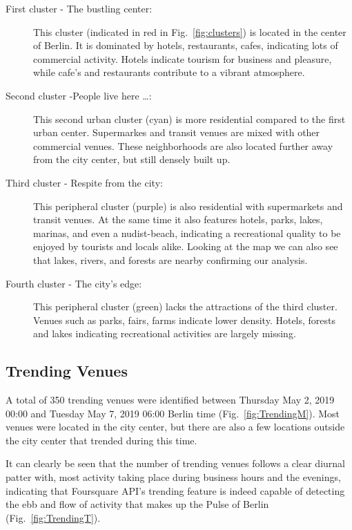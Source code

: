 \documentclass[letter]{scrartcl}
\begin{document}
\begin{description}
	\item[First cluster - The bustling center:] This cluster (indicated in red in Fig.~\ref{fig:clusters}) is located in the center of Berlin. It is dominated by hotels, restaurants, cafes, indicating lots of commercial activity. Hotels indicate tourism for business and pleasure, while cafe's and restaurants contribute to a vibrant atmosphere.  
	\item[Second cluster -People live here \ldots:] This second urban cluster (cyan) is more residential compared to the first urban center. Supermarkes and transit venues are mixed with other commercial venues. These neighborhoods are also located further away from the city center, but still densely built up.
	\item[Third cluster - Respite from the city:] This peripheral cluster (purple) is also  residential with supermarkets and transit venues. At the same time it also features hotels, parks, lakes, marinas, and even a nudist-beach, indicating a recreational quality to be enjoyed by tourists and locals alike. Looking at the map we can also see that lakes, rivers, and forests are nearby confirming our analysis.	
	\item[Fourth cluster -  The city's edge:] This peripheral cluster (green) lacks the attractions of the third cluster. Venues such as parks, fairs, farms indicate lower density. Hotels, forests and lakes indicating recreational activities are largely missing.  
\end{description}

\subsection{Trending Venues}

A total of 350 trending venues were identified between Thursday May 2, 2019 00:00 and Tuesday May 7, 2019 06:00 Berlin time (Fig.~\ref{fig:TrendingM}). Most venues were located in the city center, but there are also a few locations outside the city center that trended during this time. 

It can clearly be seen that the number of trending venues follows a clear diurnal patter with, most activity taking place during business hours and the evenings, indicating that Foursquare API's trending feature is indeed capable of detecting the ebb and flow of activity that makes up the Pulse of Berlin (Fig.~\ref{fig:TrendingT}). 
\end{document}
